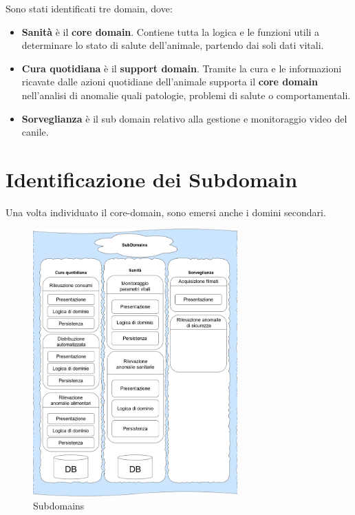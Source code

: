     Sono stati identificati tre domain, dove:
    \begin{itemize}
        \item \textbf{Sanità} è il \textbf{core domain}. Contiene tutta la logica e le funzioni utili a determinare lo stato di salute dell'animale, partendo dai soli dati vitali.
        
        \item \textbf{Cura quotidiana} è il \textbf{support domain}. Tramite la cura e le informazioni ricavate dalle azioni quotidiane dell'animale supporta il \textbf{core domain} nell'analisi di anomalie quali patologie, problemi di salute o comportamentali.
        
        \item \textbf{Sorveglianza} è il sub domain relativo alla gestione e monitoraggio video del canile.
    \end{itemize}
    
    \section{Identificazione dei Subdomain}
    Una volta individuato il core-domain, sono emersi anche i domini secondari. %
    
    \begin{figure}[ht]
        \caption{Subdomains}
        \centering
        \includegraphics[width=0.7\textwidth]{DrawIo/subDomainsView.png}
    \end{figure}
    

